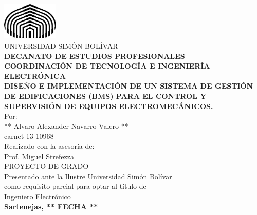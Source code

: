 \thispagestyle{empty}
\begin{center}
\includegraphics[width=0.20\textwidth]{Figuras/USB_logo.eps}\\ %
{\large UNIVERSIDAD SIMÓN BOLÍVAR}\\\textbf{DECANATO DE ESTUDIOS PROFESIONALES}\\\textbf{COORDINACIÓN DE TECNOLOGÍA E INGENIERÍA ELECTRÓNICA} %
\\[8\baselineskip]

\textbf{DISEÑO E IMPLEMENTACIÓN DE UN SISTEMA DE GESTIÓN DE EDIFICACIONES (BMS) PARA EL CONTROL Y SUPERVISIÓN DE EQUIPOS ELECTROMECÁNICOS.}
\\[2\baselineskip]

Por:\\ ** Alvaro Alexander Navarro Valero **\\ carnet 13-10968
\\[2\baselineskip]

Realizado con la asesoría de:\\ Prof. Miguel Strefezza
\\[4\baselineskip]

PROYECTO DE GRADO\\Presentado ante la Ilustre Universidad Simón Bolívar\\como requisito parcial para optar al título de \\ Ingeniero Electrónico
\\[2\baselineskip]

\textbf{Sartenejas, ** FECHA **}
\end{center}
